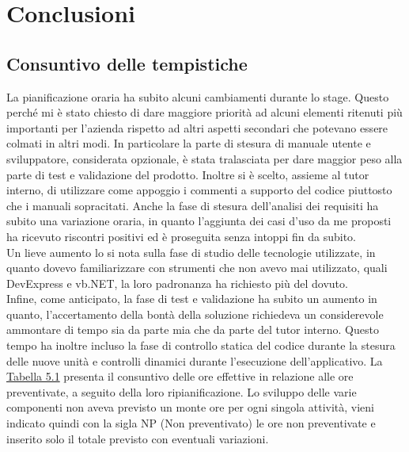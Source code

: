 
\chapter{Conclusioni}
\label{cap:conclusioni}
\section{Consuntivo delle tempistiche}
\label{tempistiche}
La pianificazione oraria ha subito alcuni cambiamenti durante lo stage. Questo perché mi è stato chiesto di dare maggiore priorità ad alcuni elementi ritenuti 
più importanti per l'azienda rispetto ad altri aspetti secondari che potevano essere colmati in altri modi. In particolare la parte di stesura di manuale utente e sviluppatore,
considerata opzionale, è stata tralasciata per dare maggior peso alla parte di test e validazione del prodotto. Inoltre si è scelto, assieme al tutor interno, di utilizzare
come appoggio i commenti a supporto del codice piuttosto che i manuali sopracitati. Anche la fase di stesura dell'analisi dei requisiti ha subito una variazione oraria, in quanto
l'aggiunta dei casi d'uso da me proposti ha ricevuto riscontri positivi ed è proseguita senza intoppi fin da subito.\\ Un lieve aumento lo si nota sulla fase di studio delle
tecnologie utilizzate, in quanto dovevo familiarizzare con strumenti che non avevo mai utilizzato, quali DevExpress e vb.NET, la loro padronanza ha richiesto più del dovuto.\\
Infine, come anticipato, la fase di test e validazione ha subito un aumento in quanto, l'accertamento della bontà della soluzione richiedeva un considerevole ammontare di tempo
sia da parte mia che da parte del tutor interno. Questo tempo ha inoltre incluso la fase di controllo statica del codice durante la stesura delle nuove unità e controlli dinamici
durante l'esecuzione dell'applicativo.
La \hyperref[effettive]{Tabella 5.1} presenta il consuntivo delle ore effettive in relazione alle ore preventivate, a seguito della loro ripianificazione.
Lo sviluppo delle varie componenti non aveva previsto un monte ore per ogni singola attività, vieni indicato quindi con la sigla NP (Non preventivato) le ore non preventivate e 
inserito solo il totale previsto con eventuali variazioni.
\newpage


